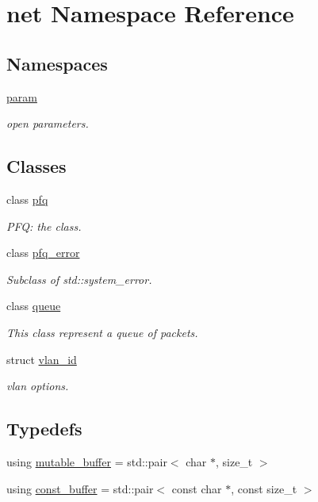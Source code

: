 \hypertarget{namespacenet}{\section{net Namespace Reference}
\label{namespacenet}
}
\subsection*{Namespaces}
\begin{DoxyCompactItemize}
\item 
 \hyperlink{namespacenet_1_1param}{param}
\begin{DoxyCompactList}\small\item\em open parameters. \end{DoxyCompactList}\end{DoxyCompactItemize}
\subsection*{Classes}
\begin{DoxyCompactItemize}
\item 
class \hyperlink{classnet_1_1pfq}{pfq}
\begin{DoxyCompactList}\small\item\em P\+F\+Q\+: the class. \end{DoxyCompactList}\item 
class \hyperlink{classnet_1_1pfq__error}{pfq\+\_\+error}
\begin{DoxyCompactList}\small\item\em Subclass of std\+::system\+\_\+error. \end{DoxyCompactList}\item 
class \hyperlink{classnet_1_1queue}{queue}
\begin{DoxyCompactList}\small\item\em This class represent a queue of packets. \end{DoxyCompactList}\item 
struct \hyperlink{structnet_1_1vlan__id}{vlan\+\_\+id}
\begin{DoxyCompactList}\small\item\em vlan options. \end{DoxyCompactList}\end{DoxyCompactItemize}
\subsection*{Typedefs}
\begin{DoxyCompactItemize}
\item 
using \hyperlink{namespacenet_ac0df3fa0efbc044d8a2441906e8f61cb}{mutable\+\_\+buffer} = std\+::pair$<$ char $\ast$, size\+\_\+t $>$
\item 
using \hyperlink{namespacenet_a05639001760fe5164b163078b5ccc2c0}{const\+\_\+buffer} = std\+::pair$<$ const char $\ast$, const size\+\_\+t $>$
\end{DoxyCompactItemize}
